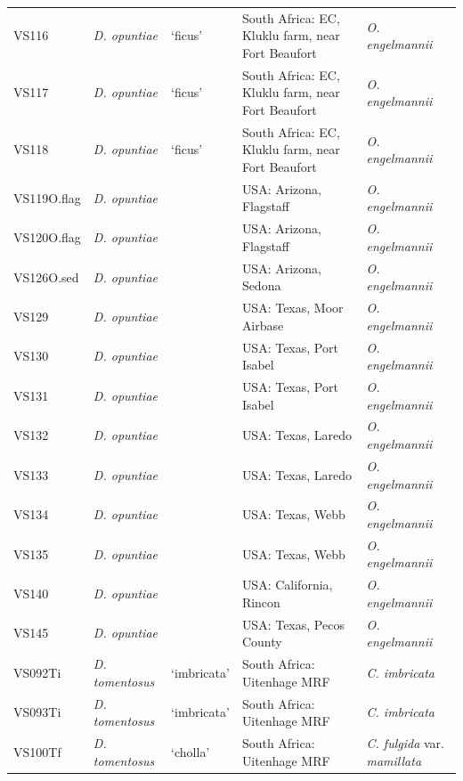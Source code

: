 \begin{landscape}
\begin{table}[H]
{\begin{tabular}{@{}lllll@{}}
VS116 & \textit{D. opuntiae} & `ficus' & South Africa: EC, Kluklu farm, near Fort Beaufort & \textit{O. engelmannii} \\
VS117 & \textit{D. opuntiae} & `ficus' & South Africa: EC, Kluklu farm, near Fort Beaufort & \textit{O. engelmannii} \\
VS118 & \textit{D. opuntiae} & `ficus' & South Africa: EC, Kluklu farm, near Fort Beaufort & \textit{O. engelmannii} \\
VS119O.flag & \textit{D. opuntiae} &  & USA: Arizona, Flagstaff & \textit{O. engelmannii} \\
VS120O.flag & \textit{D. opuntiae} &  & USA: Arizona, Flagstaff & \textit{O. engelmannii} \\
VS126O.sed & \textit{D. opuntiae} &  & USA: Arizona, Sedona & \textit{O. engelmannii} \\
VS129 & \textit{D. opuntiae} &  & USA: Texas, Moor Airbase & \textit{O. engelmannii} \\
VS130 & \textit{D. opuntiae} &  & USA: Texas, Port Isabel & \textit{O. engelmannii} \\
VS131 & \textit{D. opuntiae} &  & USA: Texas, Port Isabel & \textit{O. engelmannii} \\
VS132 & \textit{D. opuntiae} &  & USA: Texas, Laredo & \textit{O. engelmannii} \\
VS133 & \textit{D. opuntiae} &  & USA: Texas, Laredo & \textit{O. engelmannii} \\
VS134 & \textit{D. opuntiae} &  & USA: Texas, Webb & \textit{O. engelmannii} \\
VS135 & \textit{D. opuntiae} &  & USA: Texas, Webb & \textit{O. engelmannii} \\
VS140 & \textit{D. opuntiae} &  & USA: California, Rincon & \textit{O. engelmannii} \\
VS145 & \textit{D. opuntiae} &  & USA: Texas, Pecos County & \textit{O. engelmannii} \\
VS092Ti & \textit{D. tomentosus} & `imbricata' & South Africa: Uitenhage MRF & \textit{C. imbricata} \\
VS093Ti & \textit{D. tomentosus} & `imbricata' & South Africa: Uitenhage MRF & \textit{C. imbricata} \\
VS100Tf & \textit{D. tomentosus} & `cholla' & South Africa: Uitenhage MRF & \textit{C. fulgida} var. \textit{mamillata} \\ \bottomrule
\end{tabular}
}%
\end{table}



\end{landscape}
